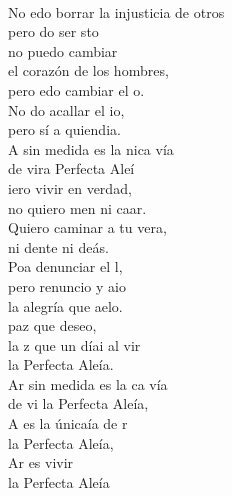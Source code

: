 \documentclass[12pt]{article}
\begin{document}
\begin{multicols*}{2}
\begin{cancion}%
	   \chord{(}{**)}{    }\\
	No edo borrar la injusticia de otros\\
	pero do ser sto \\
no puedo cambiar \\
el corazón de los hombres, \\
	pero edo cambiar el o. \\
	No do acallar el io, \\
	pero sí  a quiendia.\\
	A sin medida es la nica vía \\
	de vira Perfecta Aleí  \chord{(}{**)}{    }\\
	iero vivir en verdad, \\
	no quiero men ni caar.\\
Quiero caminar a tu vera,\\
	ni dente ni deás.\\
	Poa denunciar el l,  \\
	pero renuncio y aio \\
	la alegría que aelo.\\
	paz que deseo, \\
	la z que un díai al vir\\
	la Perfecta Aleía.   \chord{(}{**)}{    }\\
	Ar sin medida es la ca vía \\
	de vi la Perfecta Aleía,\\
	A es la únicaía de r \\
	la Perfecta Aleía,\\
	Ar es vivir  \\
	la Perfecta Aleía  \chord{(}{**)}{    }\\
\end{cancion}%


\end{multicols*}
\end{document}
